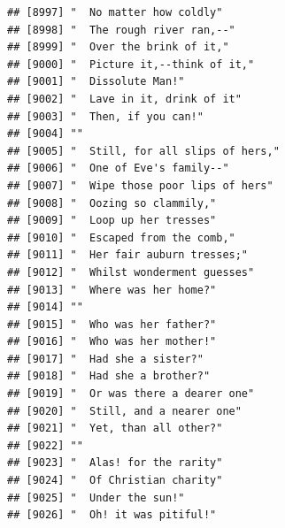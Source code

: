 \documentclass{article}\usepackage[]{graphicx}\usepackage[]{color}
\makeatletter
\newenvironment{kframe}{%
 \def\at@end@of@kframe{}%
 \ifinner\ifhmode%
  \def\at@end@of@kframe{\end{minipage}}%
  \begin{minipage}{\columnwidth}%
 \fi\fi%
 \def\FrameCommand##1{\hskip\@totalleftmargin \hskip-\fboxsep
 \colorbox{shadecolor}{##1}\hskip-\fboxsep
     \hskip-\linewidth \hskip-\@totalleftmargin \hskip\columnwidth}%
 \MakeFramed {\advance\hsize-\width
   \@totalleftmargin\z@ \linewidth\hsize
   \@setminipage}}%
 {\par\unskip\endMakeFramed%
 \at@end@of@kframe}
\newenvironment{knitrout}{}{} %
\makeatother
\begin{document}
\begin{knitrout}
\begin{kframe}
\begin{verbatim}
## [8997] "  No matter how coldly"                                                      
## [8998] "  The rough river ran,--"                                                    
## [8999] "  Over the brink of it,"                                                     
## [9000] "  Picture it,--think of it,"                                                 
## [9001] "  Dissolute Man!"                                                            
## [9002] "  Lave in it, drink of it"                                                   
## [9003] "  Then, if you can!"                                                         
## [9004] ""                                                                            
## [9005] "  Still, for all slips of hers,"                                             
## [9006] "  One of Eve's family--"                                                     
## [9007] "  Wipe those poor lips of hers"                                              
## [9008] "  Oozing so clammily,"                                                       
## [9009] "  Loop up her tresses"                                                       
## [9010] "  Escaped from the comb,"                                                    
## [9011] "  Her fair auburn tresses;"                                                  
## [9012] "  Whilst wonderment guesses"                                                 
## [9013] "  Where was her home?"                                                       
## [9014] ""                                                                            
## [9015] "  Who was her father?"                                                       
## [9016] "  Who was her mother!"                                                       
## [9017] "  Had she a sister?"                                                         
## [9018] "  Had she a brother?"                                                        
## [9019] "  Or was there a dearer one"                                                 
## [9020] "  Still, and a nearer one"                                                   
## [9021] "  Yet, than all other?"                                                      
## [9022] ""                                                                            
## [9023] "  Alas! for the rarity"                                                      
## [9024] "  Of Christian charity"                                                      
## [9025] "  Under the sun!"                                                            
## [9026] "  Oh! it was pitiful!"                                                       

\end{verbatim}
\end{kframe}
\end{knitrout}
\end{document}
